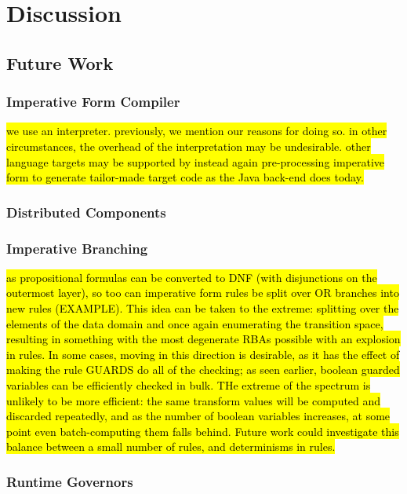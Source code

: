 \chapter{Discussion}
\section{Future Work}
\subsection{Imperative Form Compiler}
\hl{we use an interpreter. previously, we mention our reasons for doing so. in other circumstances, the overhead of the interpretation may be undesirable. other language targets may be supported by instead again pre-processing imperative form to generate tailor-made target code as the Java back-end does today.}
\subsection{Distributed Components}
\subsection{Imperative Branching}
\hl{as propositional formulas can be converted to DNF (with disjunctions on the outermost layer), so too can imperative form rules be split over OR branches into new rules (EXAMPLE). This idea can be taken to the extreme: splitting over the elements of the data domain and once again enumerating the transition space, resulting in something with the most degenerate RBAs possible with an explosion in rules. In some cases, moving in this direction is desirable, as it has the effect of making the rule GUARDS do all of the checking; as seen earlier, boolean guarded variables can be efficiently checked in bulk. THe extreme of the spectrum is unlikely to be more efficient: the same transform values will be computed and discarded repeatedly, and as the number of boolean variables increases, at some point even batch-computing them falls behind. Future work could investigate this balance between a small number of rules, and determinisms in rules.}
\subsection{Runtime Governors}
